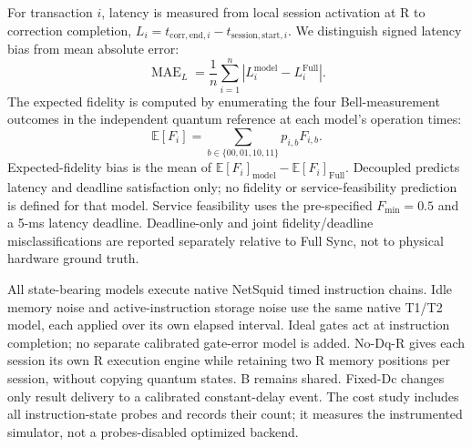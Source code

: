 For transaction $i$, latency is measured from local session activation at R
to correction completion, $L_i=t_{\mathrm{corr,end},i}-t_{\mathrm{session,start},i}$.
We distinguish signed latency bias from mean absolute error:
\begin{equation}
\operatorname{MAE}_L=\frac{1}{n}\sum_{i=1}^{n}
\left|L_i^{\mathrm{model}}-L_i^{\mathrm{Full}}\right|.
\end{equation}
The expected fidelity is computed by enumerating the four Bell-measurement
outcomes in the independent quantum reference at each model's operation times:
\begin{equation}
\mathbb{E}[F_i]=\sum_{b\in\{00,01,10,11\}}p_{i,b}F_{i,b}.
\end{equation}
Expected-fidelity bias is the mean of
$\mathbb{E}[F_i]_{\mathrm{model}}-\mathbb{E}[F_i]_{\mathrm{Full}}$.
Decoupled predicts latency and deadline satisfaction only; no fidelity or
service-feasibility prediction is defined for that model.
Service feasibility uses the pre-specified $F_{\min}=0.5$ and a 5-ms latency
deadline. Deadline-only and joint fidelity/deadline misclassifications are
reported separately relative to Full Sync, not to physical hardware ground truth.


All state-bearing models execute native NetSquid timed instruction chains.
Idle memory noise and active-instruction storage noise use the same native
T1/T2 model, each applied over its own elapsed interval. Ideal gates act at
instruction completion; no separate calibrated gate-error model is added.
No-Dq-R gives each session its own R execution engine while retaining two R
memory positions per session, without copying quantum states. B remains shared.
Fixed-Dc changes only result delivery to a calibrated constant-delay event.
The cost study includes all instruction-state probes and records their count;
it measures the instrumented simulator, not a probes-disabled optimized backend.
